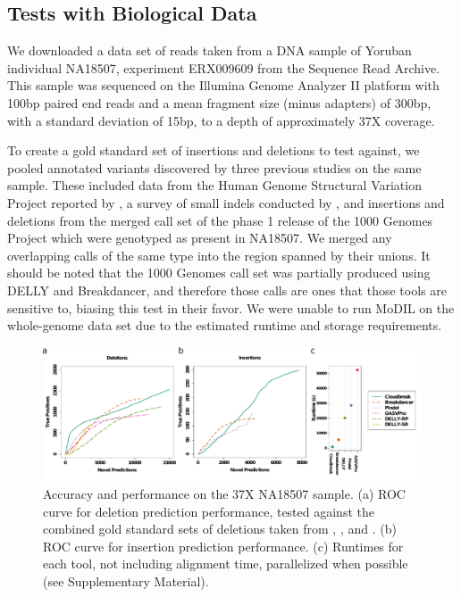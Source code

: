 \documentclass[11pt]{article}
\begin{document}
\subsection{Tests with Biological Data}

We downloaded a data set of reads taken from a DNA sample of Yoruban individual NA18507, experiment ERX009609 from the Sequence Read Archive. This sample was sequenced on the Illumina Genome Analyzer II platform with 100bp paired end reads and a mean fragment size (minus adapters) of 300bp, with a standard deviation of 15bp, to a depth of approximately 37X coverage.

To create a gold standard set of insertions and deletions to test against, we pooled annotated variants discovered by three previous studies on the same sample. These included data from the Human Genome Structural Variation Project reported by \textcite{Kidd:2008p926}, a survey of small indels conducted by \textcite{Mills:2011fi}, and insertions and deletions from the merged call set of the phase 1 release of the 1000 Genomes Project \autocite{GenomesProjectConsortium:2012co} which were genotyped as present in NA18507. We merged any overlapping calls of the same type into the region spanned by their unions. It should be noted that the 1000 Genomes call set was partially produced using DELLY and Breakdancer, and therefore those calls are ones that those tools are sensitive to, biasing this test in their favor. We were unable to run MoDIL on the whole-genome data set due to the estimated runtime and storage requirements.

\begin{figure}
\centering
\includegraphics[width=1\textwidth]{../figures/NA18507_rocs_runtime.pdf}
\caption{Accuracy and performance on the 37X NA18507 sample. (a) ROC curve for deletion prediction performance, tested against the combined gold standard sets of deletions taken from \textcite{Kidd:2008p926}, \textcite{Mills:2011fi}, and \textcite{GenomesProjectConsortium:2012co}. (b) ROC curve for insertion prediction performance. (c) Runtimes for each tool, not including alignment time, parallelized when possible (see Supplementary Material). }
\label{NA18507CombinedRoc}
\end{figure}
\end{document}
